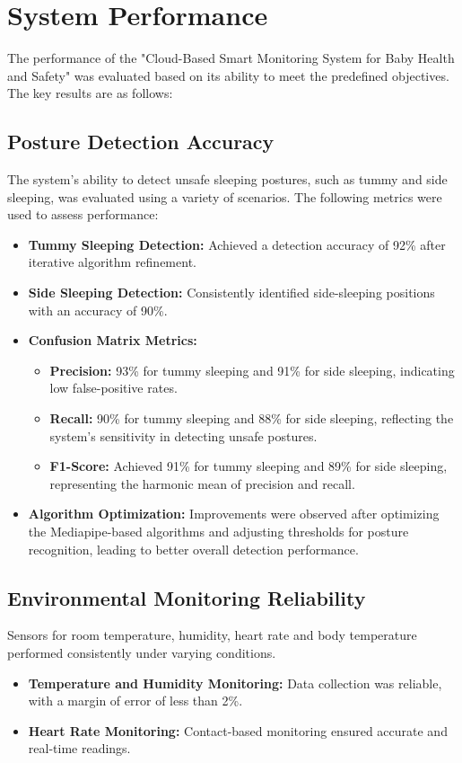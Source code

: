 \documentclass[12pt,a4paper]{report}
\begin{document}
\section{System Performance}
The performance of the "Cloud-Based Smart Monitoring System for Baby Health and Safety" was evaluated based on its ability to meet the predefined objectives. The key results are as follows:

\subsection{Posture Detection Accuracy}
The system's ability to detect unsafe sleeping postures, such as tummy and side sleeping, was evaluated using a variety of scenarios. The following metrics were used to assess performance:

\begin{itemize}
    \item \textbf{Tummy Sleeping Detection:} Achieved a detection accuracy of 92\% after iterative algorithm refinement. 
    \item \textbf{Side Sleeping Detection:} Consistently identified side-sleeping positions with an accuracy of 90\%.
    \item \textbf{Confusion Matrix Metrics:} 
    \begin{itemize}
        \item \textbf{Precision:} 93\% for tummy sleeping and 91\% for side sleeping, indicating low false-positive rates.
        \item \textbf{Recall:} 90\% for tummy sleeping and 88\% for side sleeping, reflecting the system's sensitivity in detecting unsafe postures.
        \item \textbf{F1-Score:} Achieved 91\% for tummy sleeping and 89\% for side sleeping, representing the harmonic mean of precision and recall.
    \end{itemize}
    \item \textbf{Algorithm Optimization:} Improvements were observed after optimizing the Mediapipe-based algorithms and adjusting thresholds for posture recognition, leading to better overall detection performance.
\end{itemize}


\subsection{Environmental Monitoring Reliability}
Sensors for room temperature, humidity, heart rate and body temperature performed consistently under varying conditions.
\begin{itemize}
    \item \textbf{Temperature and Humidity Monitoring:} Data collection was reliable, with a margin of error of less than 2\%.
    \item \textbf{Heart Rate Monitoring:} Contact-based monitoring ensured accurate and real-time readings.
\end{itemize}
\end{document}
